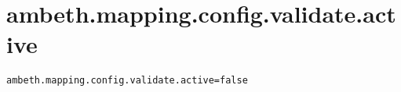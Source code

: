 \section{ambeth.mapping.config.validate.active}
\label{configuration:AmbethMappingConfigValidateActive}
\ClearAPI
\TODO
{}
\begin{lstlisting}[style=Props,caption={Usage example for \textit{ambeth.mapping.config.validate.active}}]
ambeth.mapping.config.validate.active=false
\end{lstlisting}